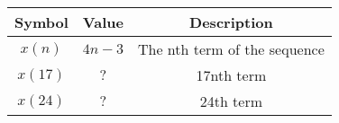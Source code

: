 
    \begin{tabular}{|c|c|c|}
    \hline
     \textbf{Symbol} & \textbf{Value} &
     \textbf{Description}\\
    \hline
     $x(n)$ &  $4n-3$ & The nth term of the sequence\\[6pt]
    \hline 
     $x(17)$ &  $?$ & 17nth term \\[6pt]
    \hline
     $x(24)$ &  $?$ & 24th term\\[6pt]
    \hline
     
\end{tabular}
